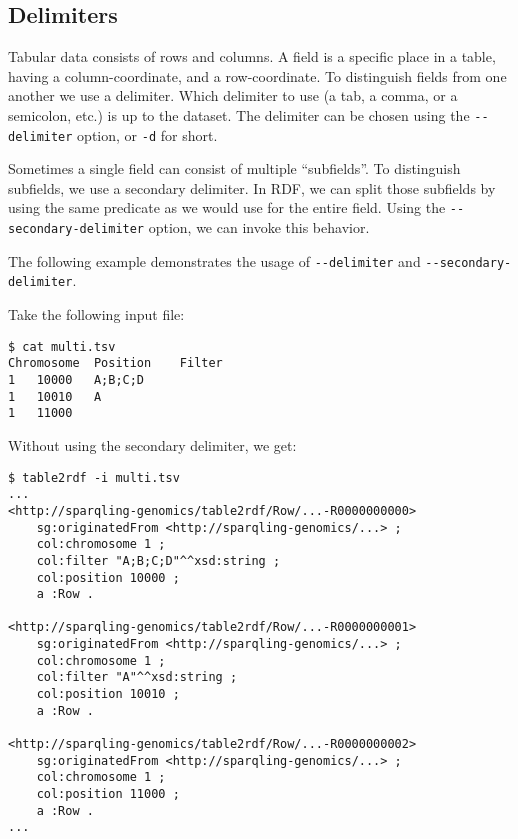 \subsection{Delimiters}

  Tabular data consists of rows and columns.  A field is a specific place in
  a table, having a column-coordinate, and a row-coordinate.  To distinguish
  fields from one another we use a delimiter.  Which delimiter to use (a tab,
  a comma, or a semicolon, etc.) is up to the dataset.  The delimiter
  can be chosen using the \texttt{-{}-delimiter} option, or \texttt{-d} for
  short.

  Sometimes a single field can consist of multiple ``subfields''.  To
  distinguish subfields, we use a secondary delimiter.  In RDF, we can split
  those subfields by using the same predicate as we would use for the entire
  field.  Using the \texttt{-{}-secondary-delimiter} option, we can invoke
  this behavior.

  The following example demonstrates the usage of \texttt{-{}-delimiter} and
  \texttt{-{}-secondary-delimiter}.

  Take the following input file:
\begin{siderules}
\begin{verbatim}
$ cat multi.tsv
Chromosome	Position	Filter
1	10000	A;B;C;D
1	10010	A
1	11000	
\end{verbatim}
\end{siderules}

  Without using the secondary delimiter, we get:

\begin{siderules}
\begin{verbatim}
$ table2rdf -i multi.tsv
...
<http://sparqling-genomics/table2rdf/Row/...-R0000000000>
    sg:originatedFrom <http://sparqling-genomics/...> ;
    col:chromosome 1 ;
    col:filter "A;B;C;D"^^xsd:string ;
    col:position 10000 ;
    a :Row .

<http://sparqling-genomics/table2rdf/Row/...-R0000000001>
    sg:originatedFrom <http://sparqling-genomics/...> ;
    col:chromosome 1 ;
    col:filter "A"^^xsd:string ;
    col:position 10010 ;
    a :Row .

<http://sparqling-genomics/table2rdf/Row/...-R0000000002>
    sg:originatedFrom <http://sparqling-genomics/...> ;
    col:chromosome 1 ;
    col:position 11000 ;
    a :Row .
...
\end{verbatim}
\end{siderules}


